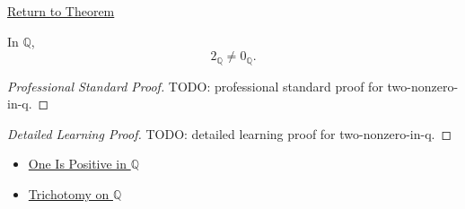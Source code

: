\newpage
{}
\label{prf:two-nonzero-in-q}

\begin{remark*}[Return]
\hyperref[lem:two-nonzero-in-q]{Return to Theorem}
\end{remark*}

\begin{lemma*}
In $\mathbb{Q}$,
\[
2_{\mathbb{Q}}\ne 0_{\mathbb{Q}}.
\]
\end{lemma*}

\begin{proof}[Professional Standard Proof]
\LRAProofBodyStart
TODO: professional standard proof for two-nonzero-in-q.
\end{proof}

\begin{proof}[Detailed Learning Proof]
\LRAProofBodyStart
TODO: detailed learning proof for two-nonzero-in-q.
\end{proof}

\begin{remark*}
\end{remark*}

\begin{dependencies}
\begin{itemize}
  \item \hyperref[cor:one-positive-on-q]{One Is Positive in $\mathbb{Q}$}
  \item \hyperref[thm:trichotomy-on-q]{Trichotomy on $\mathbb{Q}$}
\end{itemize}
\end{dependencies}

\clearpage
